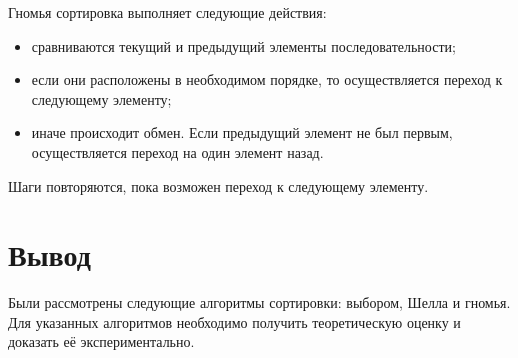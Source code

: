 Гномья сортировка \cite{gnome-sort} выполняет следующие действия:

\begin{itemize}
	\item сравниваются текущий и предыдущий элементы последовательности;
	\item если они расположены в необходимом порядке, то осуществляется переход к следующему элементу;
	\item иначе происходит обмен. Если предыдущий элемент не был первым, осуществляется переход на один элемент назад.
\end{itemize}

Шаги повторяются, пока возможен переход к следующему элементу.

\section*{Вывод}

Были рассмотрены следующие алгоритмы сортировки: выбором, Шелла и гномья. 
Для указанных алгоритмов необходимо получить теоретическую оценку и доказать её экспериментально.